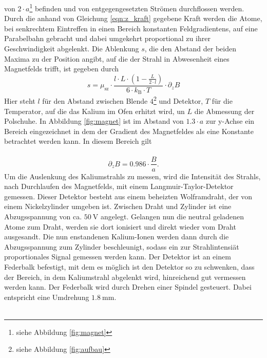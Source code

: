 von $2 \cdot a$\footnote{siehe Abbildung \ref{fig:magnet}} befinden und von entgegengesetzten Strömen
durchflossen werden. Durch die anhand von Gleichung \eqref{eqn:z_kraft} gegebene Kraft werden die Atome,
bei senkrechtem Eintreffen in einen Bereich konstanten Feldgradientens, auf eine Parabelbahn gebracht und dabei
umgekehrt proportional zu ihrer Geschwindigkeit abgelenkt. Die Ablenkung $s$, die
den Abstand der beiden Maxima zu der Position angibt, auf die der Strahl in Abwesenheit eines
Magnetfelds trifft, ist gegeben durch
\begin{equation}
  \label{eqn:ablenkung}
  s = \mu_\text{sz} \cdot \frac{l \cdot L \cdot \left( 1 - \frac{L}{2 \cdot l} \right)}{6 \cdot
      k_\text{B} \cdot T} \cdot \partial_{z} B
\end{equation}
Hier steht $l$ für den Abstand zwischen Blende $4$\footnote{siehe Abbildung \ref{fig:aufbau}} und Detektor, $T$ für die
Temperator, auf die das Kalium im Ofen erhitzt wird, un $L$ die Abmessung der Polschuhe.
In Abbildung \ref{fig:magnet} ist im Abstand von $1.3 \cdot a$ zur y-Achse ein Bereich eingezeichnet in
dem der Gradient des Magnetfeldes als eine Konstante betrachtet werden kann. In diesem Bereich gilt\\ \\
\begin{equation}
  \label{eqn:gradient}
  \partial_{z} B = 0.986 \cdot \frac{B}{a}.
\end{equation}
Um die Auslenkung des Kaliumstrahls zu messen, wird die Intensität des Strahls,
nach Durchlaufen des Magnetfelds, mit einem Langmuir-Taylor-Detektor gemessen.
Dieser Detektor besteht aus einem beheizten Wolframdraht, der von einem Nickelzylinder umgeben ist.
Zwischen Draht und Zylinder ist eine Abzugsspannung von ca. $\SI{50}{\volt}$ angelegt.
Gelangen nun die neutral geladenen Atome zum Draht, werden sie dort ionisiert und direkt wieder vom
Draht ausgesandt. Die nun enstandenen Kalium-Ionen werden dann durch die Abzugsspannung zum Zylinder
beschleunigt, sodass ein zur Strahlintensiät proportionales Signal gemessen werden kann. Der Detektor ist
an einem Federbalk befestigt, mit dem es möglich ist den Detektor so zu schwenken, dass der Bereich, in dem
Kaliumstrahl abgelenkt wird, hinreichend gut vermessen werden kann. Der Federbalk wird durch
Drehen einer Spindel gesteuert. Dabei entspricht eine Umdrehung $\SI{1.8}{\milli\meter}$.\\ \\

